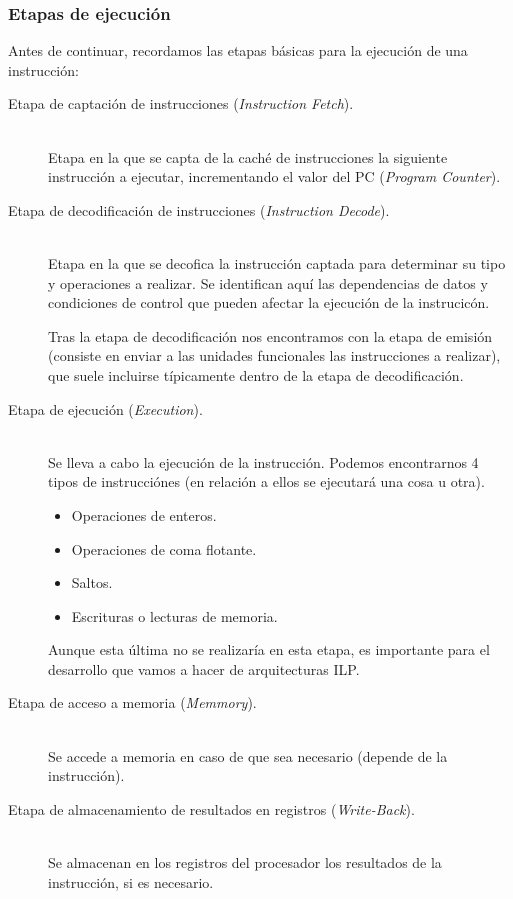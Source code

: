 \subsubsection{Etapas de ejecución}
Antes de continuar, recordamos las etapas básicas para la ejecución de una instrucción:
\begin{description}
    \item [Etapa de captación de instrucciones (\emph{Instruction Fetch}).]~\\
        Etapa en la que se capta de la caché de instrucciones la siguiente instrucción a ejecutar, incrementando el valor del PC (\emph{Program Counter}).
    \item [Etapa de decodificación de instrucciones (\emph{Instruction Decode}).]~\\
        Etapa en la que se decofica la instrucción captada para determinar su tipo y operaciones a realizar. Se identifican aquí las dependencias de datos y condiciones de control que pueden afectar la ejecución de la instrucicón.

        Tras la etapa de decodificación nos encontramos con la etapa de emisión (consiste en enviar a las unidades funcionales las instrucciones a realizar), que suele incluirse típicamente dentro de la etapa de decodificación.
    \item [Etapa de ejecución (\emph{Execution}).]~\\
        Se lleva a cabo la ejecución de la instrucción. Podemos encontrarnos 4 tipos de instrucciónes (en relación a ellos se ejecutará una cosa u otra).
        \begin{itemize}
            \item Operaciones de enteros.
            \item Operaciones de coma flotante.
            \item Saltos.
            \item Escrituras o lecturas de memoria.
        \end{itemize}
        Aunque esta última no se realizaría en esta etapa, es importante para el desarrollo que vamos a hacer de arquitecturas ILP\@.
    \item [Etapa de acceso a memoria (\emph{Memmory}).]~\\
        Se accede a memoria en caso de que sea necesario (depende de la instrucción).
    \item [Etapa de almacenamiento de resultados en registros (\emph{Write-Back}).]~\\
        Se almacenan en los registros del procesador los resultados de la instrucción, si es necesario.
\end{description}

